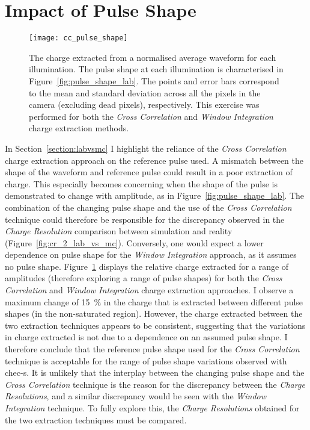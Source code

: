 \section{Impact of Pulse Shape} \label{section:pulse_shape_impact}

\begin{figure}
	\texttt{[image: cc\_pulse\_shape]}
	\caption[Relative charge extracted for different pulse shapes.]{The charge extracted from a normalised average waveform for each illumination. The pulse shape at each illumination is characterised in Figure~\ref{fig:pulse_shape_lab}. The points and error bars correspond to the mean and standard deviation across all the pixels in the camera (excluding dead pixels), respectively. This exercise was performed for both the \textit{Cross Correlation} and \textit{Window Integration} charge extraction methods.}
	\label{fig:pulse_shape_extraction}
\end{figure}

In Section~\ref{section:labvsmc} I highlight the reliance of the \textit{Cross Correlation} charge extraction approach on the reference pulse used. A mismatch between the shape of the waveform and reference pulse could result in a poor extraction of charge. This especially becomes concerning when the shape of the pulse is demonstrated to change with amplitude, as in Figure~\ref{fig:pulse_shape_lab}. The combination of the changing pulse shape and the use of the \textit{Cross Correlation} technique could therefore be responsible for the discrepancy observed in the \textit{Charge Resolution} comparison between simulation and reality (Figure~\ref{fig:cr_2_lab_vs_mc}). Conversely, one would expect a lower dependence on pulse shape for the \textit{Window Integration} approach, as it assumes no pulse shape. Figure~\ref{fig:pulse_shape_extraction} displays the relative charge extracted for a range of amplitudes (therefore exploring a range of pulse shapes) for both the \textit{Cross Correlation} and \textit{Window Integration} charge extraction approaches. I observe a maximum change of \SI{15}{\percent} in the charge that is extracted between different pulse shapes (in the non-saturated region). However, the charge extracted between the two extraction techniques appears to be consistent, suggesting that the variations in charge extracted is not due to a dependence on an assumed pulse shape. I therefore conclude that the reference pulse shape used for the \textit{Cross Correlation} technique is acceptable for the range of pulse shape variations observed with \gls{chec-s}. It is unlikely that the interplay between the changing pulse shape and the \textit{Cross Correlation} technique is the reason for the discrepancy between the \textit{Charge Resolutions}, and a similar discrepancy would be seen with the \textit{Window Integration} technique. To fully explore this, the \textit{Charge Resolutions} obtained for the two extraction techniques must be compared.

